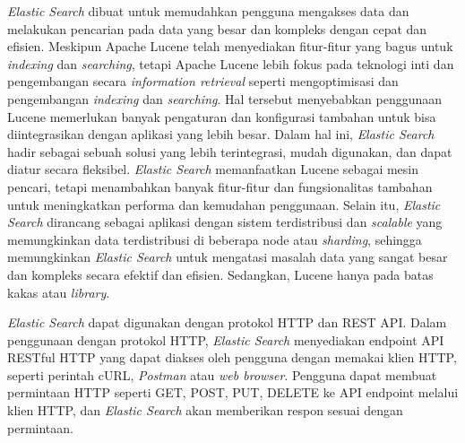 \textit{Elastic Search} dibuat untuk memudahkan pengguna mengakses data dan melakukan pencarian pada data yang besar dan kompleks dengan cepat dan efisien. Meskipun Apache Lucene telah menyediakan fitur-fitur yang bagus untuk \textit{indexing} dan \textit{searching}, tetapi Apache Lucene lebih fokus pada teknologi inti dan pengembangan secara \textit{information retrieval} seperti mengoptimisasi dan pengembangan \textit{indexing} dan \textit{searching}. Hal tersebut menyebabkan penggunaan Lucene memerlukan banyak pengaturan dan konfigurasi tambahan untuk bisa diintegrasikan dengan aplikasi yang lebih besar. Dalam hal ini, \textit{Elastic Search} hadir sebagai sebuah solusi yang lebih terintegrasi, mudah digunakan, dan dapat diatur secara fleksibel. \textit{Elastic Search} memanfaatkan Lucene sebagai mesin pencari, tetapi menambahkan banyak fitur-fitur dan fungsionalitas tambahan untuk meningkatkan performa dan kemudahan penggunaan. Selain itu, \textit{Elastic Search} dirancang sebagai aplikasi dengan sistem terdistribusi dan \textit{scalable} yang memungkinkan data terdistribusi di beberapa node atau \textit{sharding}, sehingga memungkinkan \textit{Elastic Search} untuk mengatasi masalah data yang sangat besar dan kompleks secara efektif dan efisien. Sedangkan, Lucene hanya pada batas kakas atau \textit{library}.

\textit{Elastic Search} dapat digunakan dengan protokol HTTP dan REST API. Dalam penggunaan dengan protokol HTTP, \textit{Elastic Search} menyediakan endpoint API RESTful HTTP yang dapat diakses oleh pengguna dengan memakai klien HTTP, seperti perintah cURL, \textit{Postman} atau \textit{web browser}. Pengguna dapat membuat permintaan HTTP seperti GET, POST, PUT, DELETE ke API endpoint melalui klien HTTP, dan \textit{Elastic Search} akan memberikan respon sesuai dengan permintaan.